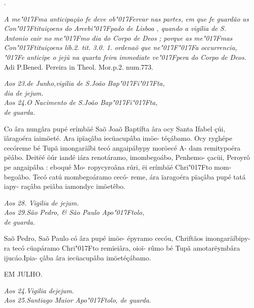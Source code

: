 \documentclass[openany,titlepage,12pt]{book}
\newcommand{\lgS}{\char"017F}
\newcommand{\lgSS}{\char"017F\char"017F}
\begin{document}
\newline
\hspace*{-1.5ex}\begin{minipage}[t]{2ex}
    .
\end{minipage}
\hspace*{1ex}\begin{minipage}[t]{0.96\linewidth}
    \textit{
    \footnotesize \hspace*{-3.5ex}A me\lgS ma anticipação fe deve ob\lgS ervar nas partes,
    em que fe guardão as Con\lgS tituiçoens do Arcebi\lgS pado
    de Lisboa , quando a vigilia de S. Antonio
    cair no me\lgS mo dia do Corpo de Deos ; porque as
    me\lgS mas Con\lgS tituiçoens lib.2. tit. 3.0. 1. ordenaõ
    que ne\lgSS a occurrencia, \lgS e anticipe o jej\~u na quarta
    feira immediate ve\lgS pera do Corpo de Deos.}
    {\small Adi P.Bened. Pereira in Theol. Mor.p.2.
    num.773.}
    \newline\vspace*{4pt}
\end{minipage}

\begin{center}
    \textit{\footnotesize Aos 23.de Junho,vigilia de S.João Bap\lgS i\lgS ta,\\
    dia de jejum.\\
    Aos 24.O Nacimento de S.João Bap\lgS i\lgS ta,\\
    de guarda.}
\end{center}


{\hspace*{-2ex}Co âra nungâra pupé erímbäé Saõ Joaõ
Baptífta âra ocy Santa Ifabel çúi, ïâragoéra
iaimöeté. Ara ipïaçâba iecüacupâba imöe-
téçábamo. Ocy ryghépe cecóreme bé Tupã
imongaräîbi tecó angaipábypy moröecé A-
dam remitypoéra pëâbo. Deitëé öúr iandé
iára renotáramo, imombegoábo, Penhemo-
çacüi, Peroyrô pe angaipâba : eboqué Mo-
ropycyroâna rúri, ëi erímbäé Chri\lgS to  mom-
begoâbo. Tecó catú mombegoáramo cecó-
reme, ára ïaragoéra pïaçâba pupé tatá iapy-
raçâba peiâba iamondyc imöetêbo.\newpage}
\vspace*{1ex}
\begin{center}
    \textit{\footnotesize Aos 28. Vigilia de jejum.\\
    Aos 29.São Pedro, \& São Paulo Apo\lgS tolo,\\
    de guarda.}
\end{center}

{\hspace*{-2ex}Saõ Pedro, Saõ Paulo có âra pupé imöe-
épyramo cecóu, Chriftãos imongaräíbipy-
ra tecó cüapáramo Chri\lgS to  remïeiâra, oioï-
rûmo bé Tupã amotarëymbâra ijucáo.Ipia-
çâba âra iecüacupâba imöetéçábamo.}
\vspace*{2ex}
\begin{center}
    {EM JULHO.\\}
\end{center}
\begin{center}
    \textit{\footnotesize Aos 24.Vigilia dejejum.\\
    Aos 25.Santiago Maior Apo\lgS tolo, de guarda.}
\end{center}
\end{document}
